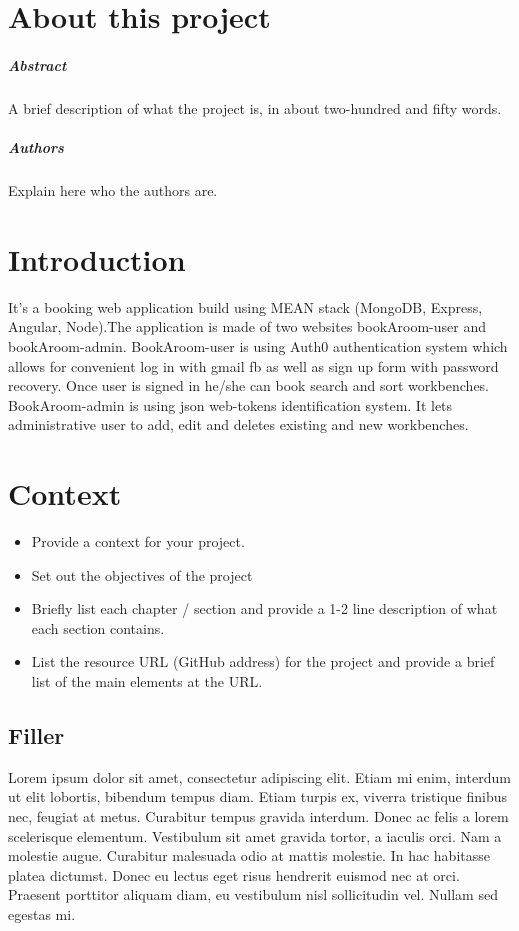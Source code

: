 \chapter*{About this project}
\paragraph{Abstract}
A brief description of what the project is, in about two-hundred and fifty words.

\paragraph{Authors}
Explain here who the authors are.



\chapter{Introduction}
It’s a booking web application build using MEAN stack (MongoDB, Express, Angular, Node).The application is made of two websites bookAroom-user and bookAroom-admin.
BookAroom-user is using Auth0 authentication system which allows for convenient log in with gmail fb as well as sign up form with password recovery. Once user is signed in he/she can book search and sort workbenches.
BookAroom-admin is using json web-tokens identification system. It lets administrative user to add, edit and deletes existing and new workbenches.

\chapter{Context}
\begin{itemize}
\item Provide a context for your project.
\item Set out the objectives of the project
\item Briefly list each chapter / section and provide a 1-2 line description of what each section contains.
\item List the resource URL (GitHub address) for the project and provide a brief list of the main elements at the URL.
\end{itemize}

\section{Filler}
Lorem ipsum dolor sit amet, consectetur adipiscing elit. Etiam mi enim, interdum ut elit lobortis, bibendum tempus diam. Etiam turpis ex, viverra tristique finibus nec, feugiat at metus. Curabitur tempus gravida interdum. Donec ac felis a lorem scelerisque elementum. Vestibulum sit amet gravida tortor, a iaculis orci. Nam a molestie augue. Curabitur malesuada odio at mattis molestie. In hac habitasse platea dictumst. Donec eu lectus eget risus hendrerit euismod nec at orci. Praesent porttitor aliquam diam, eu vestibulum nisl sollicitudin vel. Nullam sed egestas mi.


